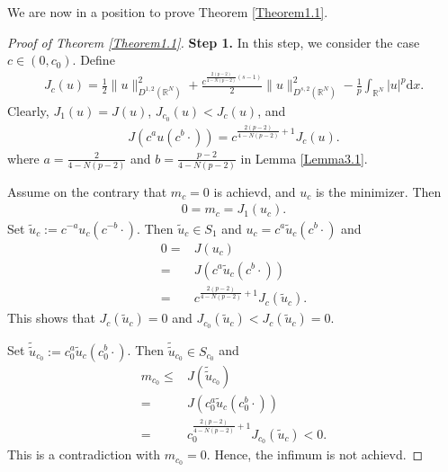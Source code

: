 \documentclass[12pt,a4paper,reqno]{amsart}
\numberwithin{equation}{section}
\begin{document}
We are now in a position to prove Theorem \ref{Theorem1.1}.
\begin{proof}[Proof of Theorem \ref{Theorem1.1}]
{\bf Step 1.} In this step, we consider the case $c\in(0,c_{0})$.
Define
\begin{equation*}
\begin{aligned}
J_{c}(u)=
\frac{1}{2}\|u\|_{D^{1,2}(\mathbb{R}^{N})}^{2}
+\frac{c^{\frac{2(p-2)}{4-N(p-2)}(s-1)}}{2}\|u\|_{D^{s,2}(\mathbb{R}^{N})}^{2}
-
\frac{1}{p}
\int_{\mathbb{R}^{N}}
|u|^{p}
\mathrm{d}x.
\end{aligned}
\end{equation*}
Clearly, $J_{1}(u)=J(u)$, $J_{c_{0}}(u)<J_{c}(u)$, and
\begin{equation*}
\begin{aligned}
J(c^{a}u(c^{b}\cdot))=c^{\frac{2(p-2)}{4-N(p-2)}+1}J_{c}(u).
\end{aligned}
\end{equation*}
where $a=\frac{2}{4-N(p-2)}$ and $b=\frac{p-2}{4-N(p-2)}$ in Lemma \ref{Lemma3.1}.


Assume on the contrary that $m_{c}=0$ is achievd, and $u_{c}$ is the minimizer. Then
\begin{equation*}
\begin{aligned}
0
=m_{c}
=J_{1}(u_{c}).
\end{aligned}
\end{equation*}
Set $\tilde{u}_{c}:=c^{-a}u_{c}(c^{-b}\cdot)$. Then $\tilde{u}_{c}\in S_{1}$ and
$
u_{c}=c^{a}\tilde{u}_{c}(c^{b}\cdot)$
and
\begin{equation*}
\begin{aligned}
0=&J(u_{c})\\
=&J(c^{a}\tilde{u}_{c}(c^{b}\cdot))\\
=&c^{\frac{2(p-2)}{4-N(p-2)}+1}J_{c}(\tilde{u}_{c}).
\end{aligned}
\end{equation*}
This shows that $J_{c}(\tilde{u}_{c})=0$ and $J_{c_{0}}(\tilde{u}_{c})<J_{c}(\tilde{u}_{c})=0$.

Set $\tilde{\tilde{u}}_{c_{0}}:=c_{0}^{a}\tilde{u}_{c}(c_{0}^{b}\cdot)$. Then $\tilde{\tilde{u}}_{c_{0}}\in S_{c_{0}}$ and
\begin{equation*}
\begin{aligned}
m_{c_{0}}\leqslant&J(\tilde{\tilde{u}}_{c_{0}})\\
=&J(c_{0}^{a}\tilde{u}_{c}(c_{0}^{b}\cdot))\\
=&c_{0}^{\frac{2(p-2)}{4-N(p-2)}+1}J_{c_{0}}(\tilde{u}_{c})<0.
\end{aligned}
\end{equation*}
This is a contradiction with $m_{c_{0}}=0$. Hence, the infimum is not achievd.



\end{proof}
\end{document}
